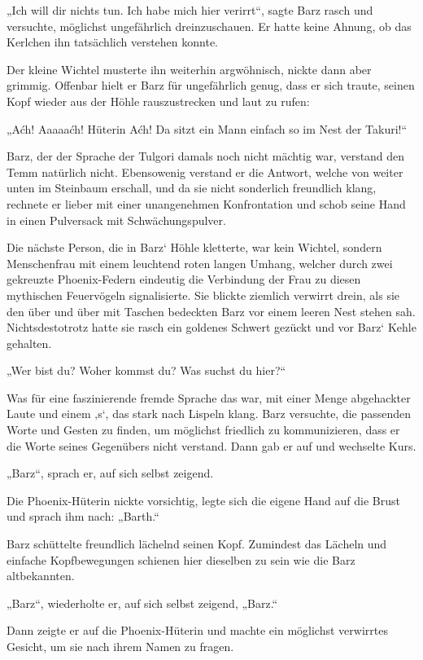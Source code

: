 „Ich will dir nichts tun. Ich habe mich hier verirrt“, sagte Barz rasch und versuchte, möglichst ungefährlich dreinzuschauen. Er hatte keine Ahnung, ob das Kerlchen ihn tatsächlich verstehen konnte.

Der kleine Wichtel musterte ihn weiterhin argwöhnisch, nickte dann aber grimmig. Offenbar hielt er Barz für ungefährlich genug, dass er sich traute, seinen Kopf wieder aus der Höhle rauszustrecken und laut zu rufen:

„Aćh! Aaaaaćh! Hüterin Aćh! Da sitzt ein Mann einfach so im Nest der Takuri!“

Barz, der der Sprache der Tulgori damals noch nicht mächtig war, verstand den Temm natürlich nicht. Ebensowenig verstand er die Antwort, welche von weiter unten im Steinbaum erschall, und da sie nicht sonderlich freundlich klang, rechnete er lieber mit einer unangenehmen Konfrontation und schob seine Hand in einen Pulversack mit Schwächungspulver.

Die nächste Person, die in Barz‘ Höhle kletterte, war kein Wichtel, sondern Menschenfrau mit einem leuchtend roten langen Umhang, welcher durch zwei gekreuzte Phoenix-Federn eindeutig die Verbindung der Frau zu diesen mythischen Feuervögeln signalisierte. Sie blickte ziemlich verwirrt drein, als sie den über und über mit Taschen bedeckten Barz vor einem leeren Nest stehen sah. Nichtsdestotrotz hatte sie rasch ein goldenes Schwert gezückt und vor Barz‘ Kehle gehalten.

„Wer bist du? Woher kommst du? Was suchst du hier?“

Was für eine faszinierende fremde Sprache das war, mit einer Menge abgehackter Laute und einem ‚s‘, das stark nach Lispeln klang. Barz versuchte, die passenden Worte und Gesten zu finden, um möglichst friedlich zu kommunizieren, dass er die Worte seines Gegenübers nicht verstand. Dann gab er auf und wechselte Kurs.

„Barz“, sprach er, auf sich selbst zeigend.

Die Phoenix-Hüterin nickte vorsichtig, legte sich die eigene Hand auf die Brust und sprach ihm nach: „Barth.“

Barz schüttelte freundlich lächelnd seinen Kopf. Zumindest das Lächeln und einfache Kopfbewegungen schienen hier dieselben zu sein wie die Barz altbekannten.

„Barz“, wiederholte er, auf sich selbst zeigend, „Barz.“

Dann zeigte er auf die Phoenix-Hüterin und machte ein möglichst verwirrtes Gesicht, um sie nach ihrem Namen zu fragen.

